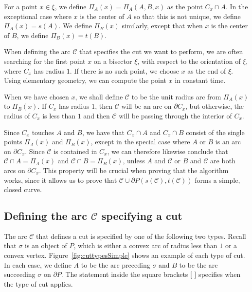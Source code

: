 \documentclass{article}
\newcommand{\PP}{P}
\newcommand{\se}{\sigma}
\newcommand{\cut}{\mathcal C}
\newcommand{\start}{s}
\newcommand{\terminal}{t}
\newcommand{\arcA}{A}
\newcommand{\arcB}{B}
\begin{document}
For a point $x\in\xi$, we define $\Pi_{\arcA}(x)=\Pi_{\arcA}(\arcA,\arcB,x)$ as the point $C_x\cap \arcA$.
In the exceptional case where $x$ is the center of $\arcA$ so that this is not unique, we define $\Pi_{\arcA}(x)=\start(\arcA)$.
We define $\Pi_{\arcB}(x)$ similarly, except that when $x$ is the center of $\arcB$, we define $\Pi_{\arcB}(x)=\terminal(\arcB)$.

When defining the arc $\cut$ that specifies the cut we want to perform, we are often searching for the first point $x$ on a bisector $\xi$, with respect to the orientation of $\xi$, where $C_{x}$ has radius $1$.
If there is no such point, we choose $x$ as the end of $\xi$.
Using elementary geometry, we can compute the point $x$ in constant time.

When we have chosen $x$, we shall define $\cut$ to be the unit radius arc from $\Pi_{\arcA}(x)$ to $\Pi_{\arcB}(x)$.
If $C_x$ has radius $1$, then $\cut$ will be an arc on $\partial C_x$, but otherwise, the radius of $C_x$ is less than $1$ and then $\cut$ will be passing through the interior of $C_x$.

Since $C_x$ touches $\arcA$ and $\arcB$, we have that $C_x\cap \arcA$ and $C_x\cap\arcB$ consist of the single points $\Pi_\arcA(x)$ and $\Pi_\arcB(x)$, except in the special case where $\arcA$ or $\arcB$ is an arc on $\partial C_x$.
Since $\cut$ is contained in $C_x$, we can therefore likewise conclude that $\cut\cap\arcA=\Pi_\arcA(x)$ and $\cut\cap\arcB=\Pi_\arcB(x)$, unless $\arcA$ and $\cut$ or $\arcB$ and $\cut$ are both arcs on $\partial C_x$.
This property will be crucial when proving that the algorithm works, since it allows us to prove that $\cut\cup \partial\PP(\start(\cut),\terminal(\cut))$ forms a simple, closed curve.

\subsection{Defining the arc $\cut$ specifying a cut}\label{cutDef}

The arc $\cut$ that defines a cut is specified by one of the following two types.
Recall that $\se$ is an object of $\PP$, which is either a convex arc of radius less than $1$ or a convex vertex. 
Figure~\ref{fig:cuttypesSimple} shows an example of each type of cut.
In each case, we define $\arcA$ to be the arc preceding $\se$ and $\arcB$ to be the arc succeeding $\se$ on $\partial\PP$.
The statement inside the square brackets [ ] specifies when the type of cut applies.
\end{document}
